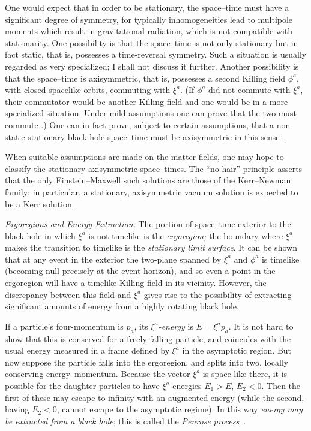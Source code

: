 \documentclass[
%
draft    %
,numberedheadings 
,bibliocites
  ]
  {aipproc}
\begin{document}
One would expect that in order to be stationary, the space--time must have a significant degree of symmetry, for typically inhomogeneities lead to multipole moments which result in gravitational radiation, which is not compatible with stationarity.  One possibility is that the space--time is not only stationary but in fact static, that is, possesses a time-reversal symmetry.  Such a situation is usually regarded as very specialized; I shall not discuss it further.  Another possibility is that the space--time is axisymmetric, that is, possesses a second Killing field $\phi ^a$, with closed spacelike orbits, commuting with $\xi ^a$.  (If $\phi ^a$ did not commute with $\xi ^a$, their commutator would be another Killing field and one would be in a more specialized situation.  Under mild assumptions one can prove that the two must commute \citep{Carter:1970ea,Carter:1979}.)  One can in fact prove, subject to certain assumptions, that a non-static stationary black-hole space--time must be axisymmetric in this sense~\citep{Hawking:1973uf,Chrusciel:2010fn}.

When suitable assumptions are made on the matter fields, one may hope to classify the stationary axisymmetric space--times.  The ``no-hair'' principle asserts that the only Einstein--Maxwell such solutions are those of the Kerr--Newman family; in particular, a stationary, axisymmetric vacuum solution is expected to be a Kerr solution.


{\em Ergoregions and Energy Extraction.}
The portion of space--time exterior to the black hole in which $\xi ^a$ is not timelike is the {\em ergoregion;} the boundary where $\xi ^a$ makes the transition to timelike is the {\em stationary limit surface}.
It can be shown that at any event in the exterior the two-plane spanned by $\xi ^a$ and $\phi ^a$ is timelike (becoming null precisely at the event horizon), and so even a point in the ergoregion will have a timelike Killing field in its vicinity.
However, the discrepancy between this field and $\xi ^a$
gives rise to the possibility of extracting significant amounts of energy from a highly rotating black hole.



If  a particle's four-momentum is $p_a$, its $\xi ^a${\em -energy} is $E=\xi ^ap_a$.  It is not hard to show that this is conserved for a freely falling particle, and coincides with the usual energy measured in a frame defined by $\xi ^a$ in the asymptotic region.  But now suppose the particle falls into the ergoregion, and splits into two, locally conserving energy--momentum.  Because the vector $\xi ^a$ is space-like there, it is possible for the daughter particles to have $\xi ^a$-energies $E_1>E$, $E_2<0$.  Then the first of these may escape to infinity with an augmented energy (while the second, having $E_2<0$, cannot escape  to the asymptotic regime).  In this way {\em energy may be extracted from a black hole}; this is called the {\em Penrose process}~\citep{Penrose:1965}.  
\end{document}
